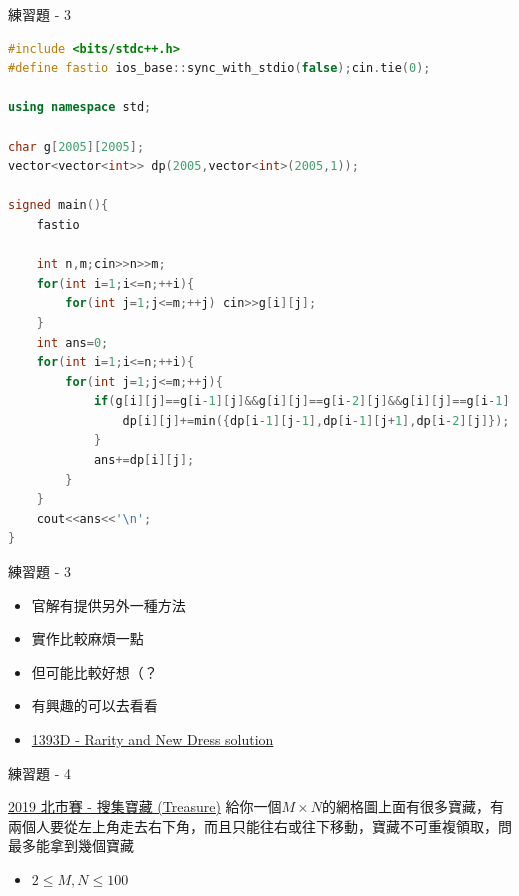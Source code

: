 \documentclass[aspectratio=169]{beamer}
\begin{document}
    \begin{frame}[fragile]{練習題 - 3}
        \begin{lstlisting}[language=C++, basicstyle=\ttfamily\tiny]
#include <bits/stdc++.h>
#define fastio ios_base::sync_with_stdio(false);cin.tie(0);

using namespace std;

char g[2005][2005];
vector<vector<int>> dp(2005,vector<int>(2005,1));

signed main(){
    fastio

    int n,m;cin>>n>>m;
    for(int i=1;i<=n;++i){
        for(int j=1;j<=m;++j) cin>>g[i][j];
    }
    int ans=0;
    for(int i=1;i<=n;++i){
        for(int j=1;j<=m;++j){
            if(g[i][j]==g[i-1][j]&&g[i][j]==g[i-2][j]&&g[i][j]==g[i-1][j+1]&&g[i][j]==g[i-1][j-1]){
                dp[i][j]+=min({dp[i-1][j-1],dp[i-1][j+1],dp[i-2][j]});
            }
            ans+=dp[i][j];
        }
    }
    cout<<ans<<'\n';
}
        \end{lstlisting}
    \end{frame}

    \begin{frame}{練習題 - 3}
        \begin{itemize}
            \item 官解有提供另外一種方法
            \item 實作比較麻煩一點
            \item 但可能比較好想（？
            \item 有興趣的可以去看看
            \item \href{https://codeforces.com/blog/entry/81161}{1393D - Rarity and New Dress solution}
        \end{itemize}
    \end{frame}

    \begin{frame}{練習題 - 4}
        \begin{block}{\href{https://tioj.ck.tp.edu.tw/problems/2173}{2019 北市賽 - 搜集寶藏 (Treasure)}}
            給你一個$M\times N$的網格圖上面有很多寶藏，有兩個人要從左上角走去右下角，而且只能往右或往下移動，寶藏不可重複領取，問最多能拿到幾個寶藏
            \begin{itemize}
                \item $2\leq M,N \leq 100$
            \end{itemize}
        \end{block}
    \end{frame}
\end{document}
